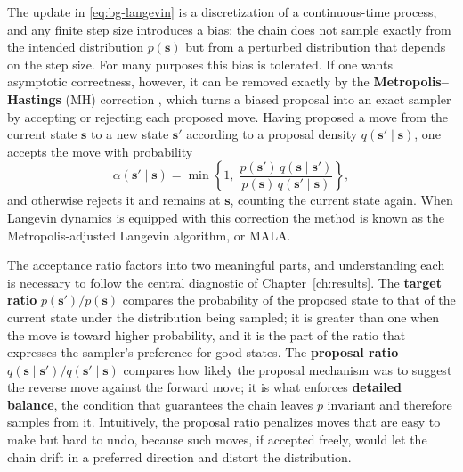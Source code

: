 The update in \eqref{eq:bg-langevin} is a discretization of a continuous-time process, and any finite step size introduces a bias: the chain does not sample exactly from the intended distribution $p(\bm{s})$ but from a perturbed distribution that depends on the step size. For many purposes this bias is tolerated. If one wants asymptotic correctness, however, it can be removed exactly by the \textbf{Metropolis--Hastings} (MH) correction \citep{metropolis1953equation, hastings1970monte}, which turns a biased proposal into an exact sampler by accepting or rejecting each proposed move. Having proposed a move from the current state $\bm{s}$ to a new state $\bm{s}'$ according to a proposal density $q(\bm{s}' \mid \bm{s})$, one accepts the move with probability
\begin{equation}
    \alpha(\bm{s}' \mid \bm{s}) = \min\left\{ 1,\; \frac{p(\bm{s}')\, q(\bm{s} \mid \bm{s}')}{p(\bm{s})\, q(\bm{s}' \mid \bm{s})} \right\},
    \label{eq:bg-mh}
\end{equation}
and otherwise rejects it and remains at $\bm{s}$, counting the current state again. When Langevin dynamics is equipped with this correction the method is known as the Metropolis-adjusted Langevin algorithm, or MALA.

The acceptance ratio factors into two meaningful parts, and understanding each is necessary to follow the central diagnostic of Chapter~\ref{ch:results}. The \textbf{target ratio} $p(\bm{s}')/p(\bm{s})$ compares the probability of the proposed state to that of the current state under the distribution being sampled; it is greater than one when the move is toward higher probability, and it is the part of the ratio that expresses the sampler's preference for good states. The \textbf{proposal ratio} $q(\bm{s} \mid \bm{s}')/q(\bm{s}' \mid \bm{s})$ compares how likely the proposal mechanism was to suggest the reverse move against the forward move; it is what enforces \textbf{detailed balance}, the condition that guarantees the chain leaves $p$ invariant and therefore samples from it. Intuitively, the proposal ratio penalizes moves that are easy to make but hard to undo, because such moves, if accepted freely, would let the chain drift in a preferred direction and distort the distribution.

